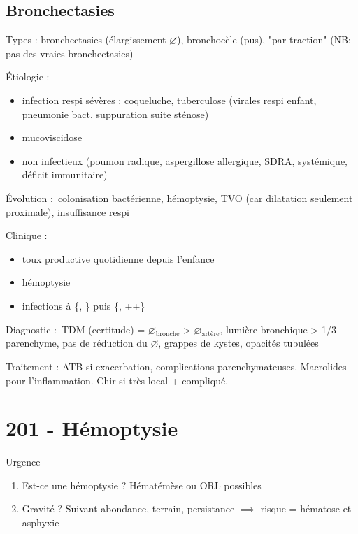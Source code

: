 \subsection{Bronchectasies}
\label{sub:bronchectasies}
Types : bronchectasies (élargissement $\diameter$), bronchocèle (pus), "par
traction" (NB: pas des vraies bronchectasies)


Étiologie : 
\begin{itemize}
\item infection respi sévères : coqueluche, tuberculose (virales respi enfant,
  pneumonie bact, suppuration suite sténose)
\item mucoviscidose
\item non infectieux (poumon radique, aspergillose allergique, SDRA,
  systémique, déficit immunitaire)
\end{itemize}

Évolution : colonisation bactérienne, hémoptysie, TVO (car dilatation seulement
proximale), insuffisance respi

Clinique :
\begin{itemize}
\item toux productive quotidienne depuis l'enfance
\item hémoptysie
\item infections à \{, \} puis \{,
  ++\}
\end{itemize}

Diagnostic : TDM (certitude) = $\diameter_\text{bronche}$ > $\diameter_\text{artère}$, lumière
bronchique > 1/3 parenchyme, pas de réduction du $\diameter$, grappes de kystes,
opacités tubulées

Traitement : ATB si exacerbation, complications parenchymateuses. Macrolides
pour l'inflammation. Chir si très local + compliqué.

\section{201 - Hémoptysie}%
\label{sec:201_hemoptysie}

Urgence \skull

\begin{enumerate}
\item Est-ce une hémoptysie ? Hématémèse ou ORL possibles
\item Gravité ? Suivant abondance, terrain, persistance $\implies$ risque = hématose et asphyxie
\end{enumerate}

